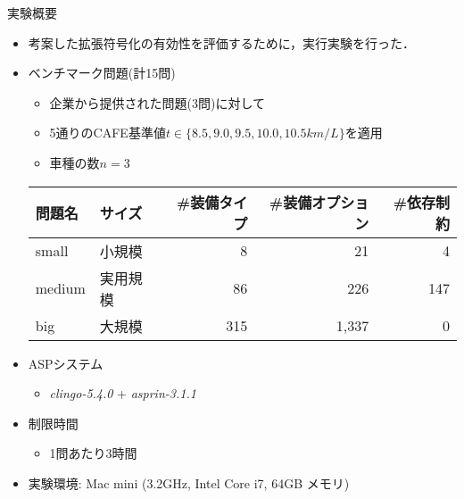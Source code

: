 \documentclass[dvipdfmx, 11pt]{beamer}
\begin{document}
\begin{frame}{実験概要}
 \begin{itemize}
  \item 考案した拡張符号化の有効性を評価するために，実行実験を行った．
 \end{itemize}

\begin{itemize}
\item ベンチマーク問題(計15問)
  \begin{itemize}
  \item 企業から提供された問題(3問)に対して
  \item 5通りのCAFE基準値$t\in\{8.5, 9.0, 9.5, 10.0, 10.5km/L\}$を適用
  \item 車種の数$n = 3$
  \end{itemize}
  \begin{exampleblock}\small
    \centering
    \begin{tabular}{ ll|r r r }
      問題名 & サイズ &  \#装備タイプ & \#装備オプション& \#依存制約\\ \hline
      small	 & 小規模   &   8 &   21  &   4	\\
      medium & 実用規模 &  86 &  226  & 147	\\
      big    & 大規模   & 315 & 1,337 &   0
    \end{tabular}
  \end{exampleblock}
 \item ASPシステム
       \begin{itemize}
	\item \textit{clingo-5.4.0} + \textit{asprin-3.1.1}
       \end{itemize}
 \item 制限時間
       \begin{itemize}
	\item 1問あたり3時間
       \end{itemize}
 \item 実験環境: Mac mini (3.2GHz, Intel Core i7, 64GB メモリ)
\end{itemize}
\end{frame}
\end{document}
